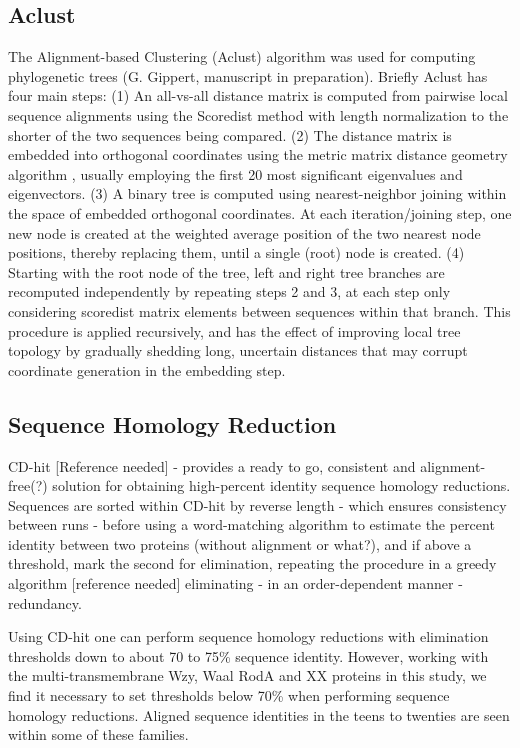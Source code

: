 \documentclass{article}
\begin{document}
\subsection{Aclust}

The Alignment-based Clustering (Aclust) algorithm was used for computing phylogenetic trees (G. Gippert, manuscript in preparation). Briefly Aclust has four main steps: (1) An all-vs-all distance matrix is computed from pairwise local sequence alignments using the Scoredist method \cite{sonnhammer_no_2005} with length normalization to the shorter of the two sequences being compared. (2) The distance matrix is embedded into orthogonal coordinates using the metric matrix distance geometry algorithm \cite{crippen_distance_1988}, usually employing the first 20 most significant eigenvalues and eigenvectors. (3) A binary tree is computed using nearest-neighbor joining within the space of embedded orthogonal coordinates. At each iteration/joining step, one new node is created at the weighted average position of the two nearest node positions, thereby replacing them, until a single (root) node is created. (4) Starting with the root node of the tree, left and right tree branches are recomputed independently by repeating steps 2 and 3, at each step only considering scoredist matrix elements between sequences within that branch. This procedure is applied recursively, and has the effect of improving local tree topology by gradually shedding long, uncertain distances that may corrupt coordinate generation in the embedding step.

\subsection{Sequence Homology Reduction}

CD-hit [Reference needed] - provides a ready to go, consistent and alignment-free(?) solution for obtaining high-percent identity sequence homology reductions. Sequences are sorted within CD-hit by reverse length - which ensures consistency between runs - before using a word-matching algorithm to estimate the percent identity between two proteins (without alignment or what?), and if above a threshold, mark the second for elimination, repeating the procedure in a greedy algorithm [reference needed] eliminating - in an order-dependent manner - redundancy.

Using CD-hit one can perform sequence homology reductions with elimination thresholds down to about 70 to 75\% sequence identity. However, working with the multi-transmembrane Wzy, Waal RodA and XX proteins in this study, we find it necessary to set thresholds below 70\% when performing sequence homology reductions. Aligned sequence identities in the teens to twenties are seen within some of these families.
\end{document}
